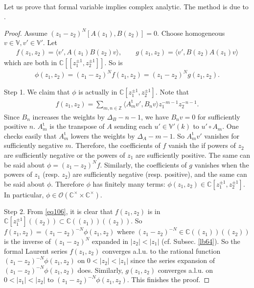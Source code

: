\documentclass[12pt,a4paper,notitlepage]{article}
\theoremstyle{definition}
\theoremstyle{plain}
\newcommand{\tr}{\mathrm{t}} %
\newcommand{\bk}[1]{\langle {#1}\rangle}
\newcommand{\scr}{\mathscr}
\newcommand{\Vbb}{\mathbb V}
\newcommand{\Cbb}{\mathbb C}
\newcommand{\Zbb}{\mathbb Z}
\numberwithin{equation}{section}
\begin{document}
\subsection{}\label{lb68}

Let us prove that formal variable implies complex analytic. The method is due to \cite{FHL93}.
\begin{proof}
Assume $(z_1-z_2)^N[A(z_1),B(z_2)]=0$. Choose homogeneous $v\in\Vbb,v'\in\Vbb'$. Let
\begin{align*}
	f(z_1,z_2)=	\bk{v',A(z_1)B(z_2)v},\qquad g(z_1,z_2)=\bk{v',B(z_2)A(z_1)v}
\end{align*}
which are both in $\Cbb[[z_1^{\pm1},z_2^{\pm1}]]$. So is
\begin{align*}
	\phi(z_1,z_2)=(z_1-z_2)^Nf(z_1,z_2)=(z_1-z_2)^Ng(z_1,z_2).	
\end{align*}


Step 1. We claim that $\phi$ is actually in $\Cbb[z_1^{\pm1},z_2^{\pm1}]$. Note that
\begin{align}
f(z_1,z_2)=\sum_{m,n\in\Zbb}\bk{A^\tr_mv',B_nv}z_1^{-m-1}z_2^{-n-1}.\label{eq106}
\end{align}
Since $B_n$ increases the weights by $\Delta_B-n-1$, we have $B_nv=0$ for sufficiently positive $n$. $A_m^\tr$ is the transpose of $A$ sending each $u'\in\Vbb'(k)$ to $u'\circ A_m$. One checks easily that $A_m^\tr$ lowers the weights by $\Delta_A-m-1$. So $A_m^\tr v'$ vanishes for sufficiently negative $m$. Therefore, the coefficients of $f$ vanish the if powers of $z_2$ are sufficiently negative or the powers of $z_1$ are sufficiently positive. The same can be said about $\phi=(z_1-z_2)^Nf$. Similarly, the coefficients of $g$ vanishes when the powers of $z_1$ (resp. $z_2$) are sufficiently negative (resp. positive), and the same can be said about $\phi$. Therefore $\phi$ has finitely many terms: $\phi(z_1,z_2)\in\Cbb[z_1^{\pm1},z_2^{\pm1}]$. In particular, $\phi\in\scr O(\Cbb^\times\times\Cbb^\times)$.

Step 2. From \eqref{eq106}, it is clear that $f(z_1,z_2)$ is in $\Cbb[z_1^{\pm1}]((z_2))\subset\Cbb((z_1))((z_2))$. So $f(z_1,z_2)=(z_1-z_2)^{-N}\phi(z_1,z_2)$ where $(z_1-z_2)^{-N}\in\Cbb((z_1))((z_2))$ is the inverse of $(z_1-z_2)^N$ expanded in $|z_2|<|z_1|$ (cf. Subsec. \ref{lb64}). So the formal Laurent series $f(z_1,z_2)$ converges a.l.u. to the rational function $(z_1-z_2)^{-N}\phi(z_1,z_2)$ on $0<|z_2|<|z_1|$ since the series expansion of $(z_1-z_2)^{-N}\phi(z_1,z_2)$ does. Similarly, $g(z_1,z_2)$ converges a.l.u. on $0<|z_1|<|z_2|$ to $(z_1-z_2)^{-N}\phi(z_1,z_2)$. This finishes the proof.
\end{proof}
\end{document}
